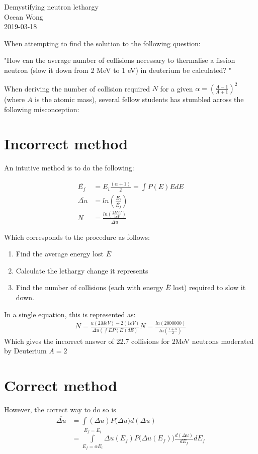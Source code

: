 \documentclass[a4paper, 12pt]{article}
\begin{document}
\begin{center}
Demystifying neutron lethargy			\\
Ocean Wong								\\
2019-03-18
\end{center}

When attempting to find the solution to the following question:

"How can the average number of collisions necessary to thermalise a fission neutron (slow
it down from 2 MeV to 1 eV) in deuterium be calculated?
"

When deriving the number of collision required $N$ for a given $\alpha = (\frac{A-1}{A+1})^2$ (where $A$ is the atomic mass), several fellow students has stumbled across the following misconception:

\section{Incorrect method}\label{Incorrect}
An intutive method is to do the following:

\begin{align}
	\overline{E_f} &= {E_i} \frac{(\alpha+1)}{2} =  \int P(E) E dE \\
	\overline{\Delta u} &= ln \left( \frac{E_i}{\overline{E_f}} \right)	\\
	N &= \frac{ ln \left( \frac{2 MeV}{1eV} \right)} { \overline{\Delta u} }
\end{align}

Which corresponds to the procedure as follows:
\begin{enumerate}
	\item Find the average energy lost $\overline{E}$
	\item Calculate the lethargy change it represents
	\item Find the number of collisions (each with energy $\overline{E}$ lost) required to slow it down.
\end{enumerate}

In a single equation, this is represented as:
\begin{align}
	N=\frac{u(2MeV) - 2(1eV)}{\Delta u \left(\int E P(E) dE \right) }
	N=\frac{ln\left(2000000\right)}{ln\left(\frac{1+\alpha}{2} \right)}
\end{align}
Which gives the incorrect answer of 22.7 collisions for 2MeV neutrons moderated by Deuterium $A=2$

\section{Correct method} \label{Correct}
	However, the correct way to do so is 
\begin{align}
	\overline{\Delta u} &= \int (\Delta u) P\big(\Delta u \big) d(\Delta u)	\\
		&= \int\limits_{E_f=\alpha E_i}^{E_f=E_i} \Delta u (E_f) P\big(\Delta u (E_f) \big) \frac{d(\Delta u)}{dE_f} dE_f \label{scaleUprob}
\end{align}
\end{document}
